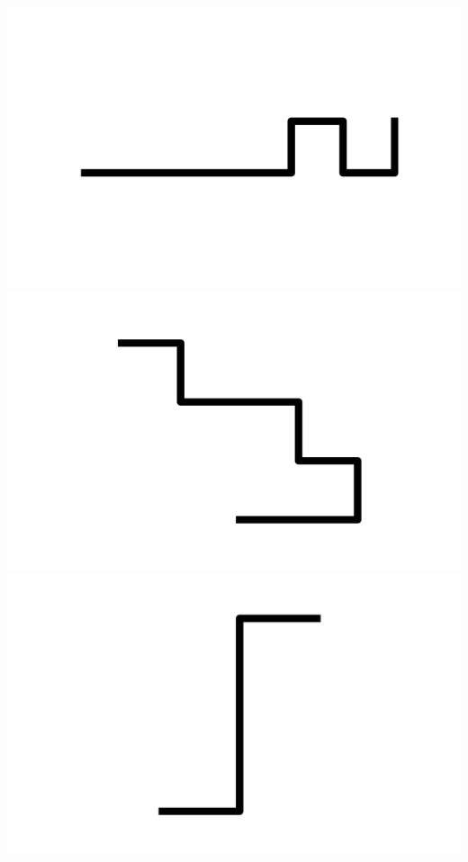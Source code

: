 \documentclass[]{report}
\begin{document}
\includegraphics[scale=.1]{pictures/21/state_cluster_shapes_307.pdf} 
\includegraphics[scale=.1]{pictures/21/state_cluster_shapes_308.pdf} 
\includegraphics[scale=.1]{pictures/21/state_cluster_shapes_309.pdf} 
\end{document}
